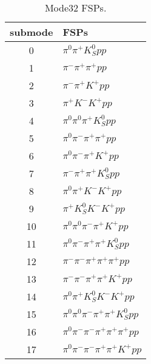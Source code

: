 \begin{table}[h!]
\begin{center}
\begin{tabular}{cl}
\hline
submode& FSPs\\
\hline
0 & $\pi^0 \pi^+ K_S^0 {p} p $ \\
1 & $\pi^- \pi^+ \pi^+ {p} p $ \\
2 & $\pi^- \pi^+ K^+ {p} p $ \\
3 & $\pi^+ K^- K^+ {p} p $ \\
4 & $\pi^0 \pi^0 \pi^+ K_S^0 {p} p $ \\
5 & $\pi^0 \pi^- \pi^+ \pi^+ {p} p $ \\
6 & $\pi^0 \pi^- \pi^+ K^+ {p} p $ \\
7 & $\pi^- \pi^+ \pi^+ K_S^0 {p} p $ \\
8 & $\pi^0 \pi^+ K^- K^+ {p} p $ \\
9 & $\pi^+ K_S^0 K^- K^+ {p} p $ \\
10 & $\pi^0 \pi^0 \pi^- \pi^+ K^+ {p} p $ \\
11 & $\pi^0 \pi^- \pi^+ \pi^+ K_S^0 {p} p $ \\
12 & $\pi^- \pi^- \pi^+ \pi^+ \pi^+ {p} p $ \\
13 & $\pi^- \pi^- \pi^+ \pi^+ K^+ {p} p $ \\
14 & $\pi^0 \pi^+ K_S^0 K^- K^+ {p} p $ \\
15 & $\pi^0 \pi^0 \pi^- \pi^+ \pi^+ K_S^0 {p} p $ \\
16 & $\pi^0 \pi^- \pi^- \pi^+ \pi^+ \pi^+ {p} p $ \\
17 & $\pi^0 \pi^- \pi^- \pi^+ \pi^+ K^+ {p} p $ \\
\hline
\end{tabular}
\label{tab:Mode32FSPs}
\caption{Mode32 FSPs.}
\end{center}
\end{table}
